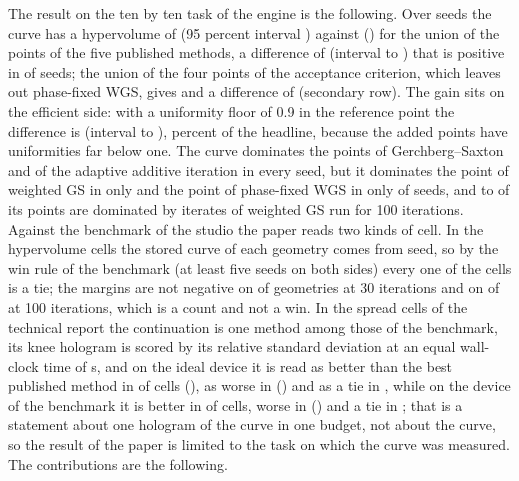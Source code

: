 The result on the ten by ten task of the engine is the following. Over \nSeeds{} seeds the curve has a hypervolume of \hvFront{} (95 percent interval \hvFrontCi) against \hvFivePub{} (\hvFivePubCi) for the union of the points of the five published methods, a difference of
\hvFiveDiff{} (interval \hvFiveLo{} to \hvFiveHi) that is positive in \hvFiveGe{} of \nSeeds{} seeds; the union of the four points of the acceptance criterion, which leaves out phase-fixed WGS, gives \hvPub{} and a difference of \hvFourDiff{} (secondary row). The gain sits on the efficient side: with a uniformity floor of 0.9 in the reference point the difference is \hvRefFiveUNineDiff{} (interval \hvRefFiveUNineLo{} to \hvRefFiveUNineHi), \hvRefFiveUNineShare{} percent of the headline, because the added points have uniformities far below one. The curve dominates the points of Gerchberg--Saxton and of the adaptive additive iteration in every seed, but it dominates the point of weighted GS in only \domGSWSeeds{} and the point of phase-fixed WGS in only \domPFSeeds{} of \nSeeds{} seeds, and \frontDomMin{} to \frontDomMax{} of its \nLambda{} points are dominated by iterates of weighted GS run for 100 iterations. Against the benchmark of the studio the paper reads two kinds of cell. In the hypervolume cells the stored curve of each geometry comes from \benchSeedsFrontThirty{} seed, so by the win rule of the benchmark (at least five seeds on both sides) every one of the \benchCells{} cells is a tie; the margins are not negative on \benchPassThirty{} of \benchNThirty{} geometries at 30 iterations and on \benchPassHundred{} of \benchNHundred{} at 100 iterations, which is a count and not a win. In the spread cells of the technical report the continuation is one method among those of the benchmark, its knee hologram is scored by its relative standard deviation at an equal wall-clock time of \spreadBudget{} s, and on the ideal device it is read as better than the best published method in \spreadWins{} of \spreadCells{} cells (\spreadWinList{}), as worse in \spreadLosses{} (\spreadLossList{}) and as a tie in \spreadTies{}, while on the device of the benchmark it is better in \spreadDevWins{} of \spreadDevCells{} cells, worse in \spreadDevLosses{} (\spreadDevLossList{}) and a tie in \spreadDevTies{}; that is a statement about one hologram of the curve in one budget, not about the curve, so the result of the paper is limited to the task on which the curve was measured. The contributions are the following.

